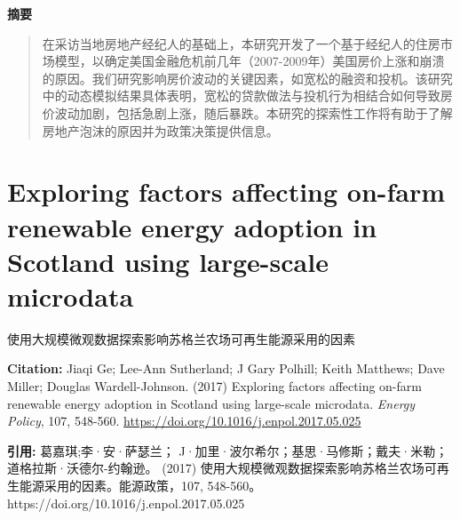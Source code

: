\noindent\textbf{摘要}\par
\begin{quote}\small
在采访当地房地产经纪人的基础上，本研究开发了一个基于经纪人的住房市场模型，以确定美国金融危机前几年（2007-2009年）美国房价上涨和崩溃的原因。我们研究影响房价波动的关键因素，如宽松的融资和投机。该研究中的动态模拟结果具体表明，宽松的贷款做法与投机行为相结合如何导致房价波动加剧，包括急剧上涨，随后暴跌。本研究的探索性工作将有助于了解房地产泡沫的原因并为政策决策提供信息。
\end{quote}

\vspace{0.5em}
\chapter{Exploring factors affecting on-farm renewable energy adoption in Scotland using large-scale microdata}
\begin{center}\small 使用大规模微观数据探索影响苏格兰农场可再生能源采用的因素\end{center}

\noindent\textbf{Citation:} Jiaqi Ge; Lee-Ann Sutherland; J Gary Polhill; Keith Matthews; Dave Miller; Douglas Wardell-Johnson. (2017) Exploring factors affecting on-farm renewable energy adoption in Scotland using large-scale microdata. \textit{Energy Policy}, 107, 548-560. \url{https://doi.org/10.1016/j.enpol.2017.05.025}

\vspace{0.5em}
\noindent\textbf{引用:} 葛嘉琪;李·安·萨瑟兰； J·加里·波尔希尔；基思·马修斯；戴夫·米勒；道格拉斯·沃德尔-约翰逊。 (2017) 使用大规模微观数据探索影响苏格兰农场可再生能源采用的因素。能源政策，107, 548-560。 https://doi.org/10.1016/j.enpol.2017.05.025

